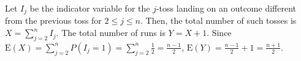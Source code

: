 Let $I_{j}$ be the indicator variable for the $j$-toss landing on an outcome
different from the previous toss for $2 \leq j \leq n$. Then, the total number
of such tosses is $X = \sum_{j=2}^{n}I_{j}$. The total number of runs
is $Y = X + 1$. Since $\text{E}(X) = \sum_{j=2}^{n}P(I_
{j}=1) = \sum_{j=2}^{n}\frac{1}{2} = \frac{n-1}{2}$, $\text{E}(Y) = \frac{n-1}
{2} + 1 = \frac{n+1}{2}$.